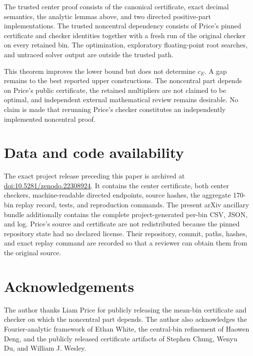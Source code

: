 \documentclass[11pt]{article}
\begin{document}
The trusted center proof consists of the canonical certificate, exact decimal
semantics, the analytic lemmas above, and two directed positive-part
implementations. The trusted noncentral dependency consists of Price's pinned
certificate and checker identities together with a fresh run of the original
checker on every retained bin. The optimization, exploratory floating-point
root searches, and untraced solver output are outside the trusted path.

This theorem improves the lower bound but does not determine $c_E$. A gap
remains to the best reported upper constructions. The noncentral part depends
on Price's public certificate, the retained multipliers are not claimed to be
optimal, and independent external mathematical review remains desirable. No
claim is made that rerunning Price's checker constitutes an independently
implemented noncentral proof.

\section{Data and code availability}

The exact project release preceding this paper is archived at
\href{https://doi.org/10.5281/zenodo.22308924}
{doi:10.5281/zenodo.22308924}. It contains the center certificate, both center
checkers, machine-readable directed endpoints, source hashes, the aggregate
170-bin replay record, tests, and reproduction commands. The present arXiv
ancillary bundle additionally contains the complete project-generated
per-bin CSV, JSON, and log. Price's source and certificate are not
redistributed because the pinned repository state had no declared license.
Their repository, commit, paths, hashes, and exact replay command are recorded
so that a reviewer can obtain them from the original source.

\section*{Acknowledgements}

The author thanks Liam Price for publicly releasing the mean-bin certificate
and checker on which the noncentral part depends. The author also acknowledges
the Fourier-analytic framework of Ethan White, the central-bin refinement of
Haowen Deng, and the publicly released certificate artifacts of Stephen
Chung, Wenyu Du, and William J. Wesley.
\end{document}
